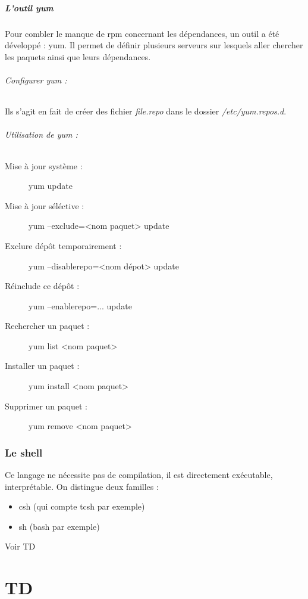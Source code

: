 \documentclass{article}
\begin{document}
\subsubsection{L'outil yum}
Pour combler le manque de rpm concernant les dépendances, un outil a été développé : yum. Il permet de définir plusieurs serveurs sur lesquels aller chercher les paquets ainsi que leurs dépendances.

\paragraph{Configurer yum : \\}
Ils s'agit en fait de créer des fichier \textit{file.repo} dans le dossier \textit{/etc/yum.repos.d}. 

\paragraph{Utilisation de yum : \\}
\begin{description}
	\item[Mise à jour système :] yum update
	\item[Mise à jour séléctive :] yum --exclude=<nom paquet> update
	\item[Exclure dépôt temporairement :] yum --disablerepo=<nom dépot> update
	\item[Réinclude ce dépôt :] yum --enablerepo=... update
	\item[Rechercher un paquet :] yum list <nom paquet>
	\item[Installer un paquet :] yum install <nom paquet>
	\item[Supprimer un paquet :]yum remove <nom paquet>
\end{description}

\section{Le shell}
Ce langage ne nécessite pas de compilation, il est directement exécutable, interprétable. On distingue deux familles : \begin{itemize}
	\item csh (qui compte tcsh par exemple)
	\item sh (bash par exemple)
\end{itemize}

Voir TD

\newpage
\part{TD}
\end{document}
